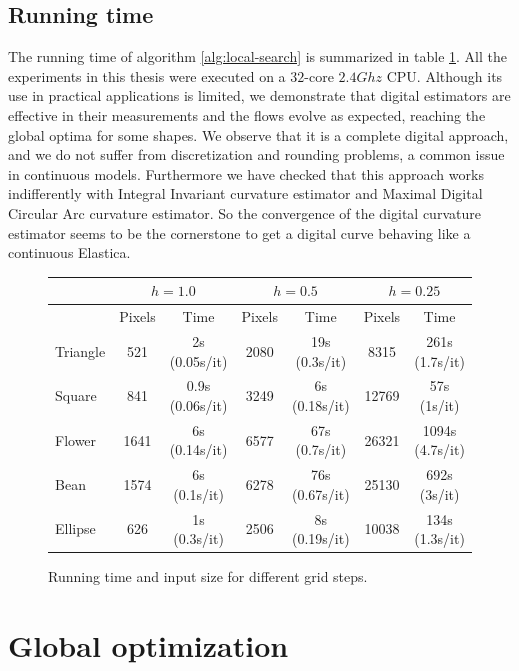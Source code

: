 \subsection{Running time}
\label{ch6:subsec:running-time}

The running time of algorithm \ref{alg:local-search} is summarized in table \ref{tab:summary-local-comb-rtime}. All the experiments in this thesis were executed on a $32$-core $2.4Ghz$ CPU. Although its use in practical applications is
limited, we demonstrate that digital estimators are effective in their measurements and the flows evolve as expected, reaching the global optima for some shapes. We
observe that it is a complete digital approach, and we do not suffer from discretization and rounding problems, a common
issue in continuous models.  Furthermore we have checked that this approach works indifferently with Integral Invariant
curvature estimator and Maximal Digital Circular Arc curvature estimator. So the convergence of the digital curvature
estimator seems to be the cornerstone to get a digital curve behaving like a continuous Elastica. 

\begin{figure}[h!]
\center
\captionsetup{type=table}
\begin{tabular}{|l|c|c|c|c|c|c|}
\hline
& \multicolumn{2}{c|}{$h=1.0$} & \multicolumn{2}{c|}{$h=0.5$} & \multicolumn{2}{c|}{$h=0.25$}\\
\hline
& Pixels & Time & Pixels & Time & Pixels & Time\\
\hline
Triangle & 521 & 2s (0.05s/it)  & 2080 & 19s (0.3s/it) & 8315 & 261s (1.7s/it)\\
Square & 841 & 0.9s (0.06s/it) & 3249 & 6s (0.18s/it) & 12769 & 57s (1s/it)\\
Flower & 1641 & 6s (0.14s/it) & 6577 & 67s (0.7s/it) & 26321 & 1094s (4.7s/it)\\
Bean  & 1574 & 6s (0.1s/it) & 6278 & 76s (0.67s/it) & 25130 & 692s (3s/it)\\
Ellipse  & 626 & 1s (0.3s/it) & 2506 & 8s (0.19s/it) & 10038 & 134s (1.3s/it)\\
\hline
\end{tabular}
\caption{Running time and input size for different grid steps.}
\label{tab:summary-local-comb-rtime} 
\end{figure}





\section{Global optimization}\label{sec:global-optmization-model}
\label{ch6:sec:global-optimization}

